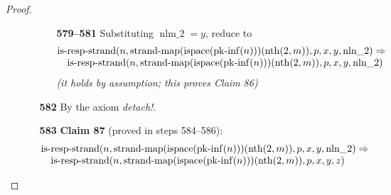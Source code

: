 \documentclass[11pt]{article}
\theoremstyle{plain}
\begin{document}
\begin{proof}
\begin{itemize}[leftmargin=2.8em, itemsep=4pt, parsep=1pt]
\begin{itemize}[leftmargin=2.8em, itemsep=4pt, parsep=1pt]
  \begin{itemize}[leftmargin=2.8em, itemsep=4pt, parsep=1pt]
  \item[\textbf{579--581}] Substituting $\operatorname{nlm\_2} = y$, reduce to
\begin{equation*}
\begin{array}{@{}l@{}} \operatorname{is\text{-}resp\text{-}strand}(n, \operatorname{strand\text{-}map}(\operatorname{ispace}(\operatorname{pk\text{-}inf}(n)))(\operatorname{nth}(2, m)), p, x, y, \operatorname{nln\_2}) \Rightarrow  \\ \quad \operatorname{is\text{-}resp\text{-}strand}(n, \operatorname{strand\text{-}map}(\operatorname{ispace}(\operatorname{pk\text{-}inf}(n)))(\operatorname{nth}(2, m)), p, x, y, \operatorname{nln\_2}) \end{array}
\end{equation*}
  \emph{(it holds by assumption; this proves Claim 86)}
  \end{itemize}
  \item[\textbf{582}] By the axiom \emph{detach!}.
  \item[\textbf{583}] \textbf{Claim 87} (proved in steps 584--586):
\begin{equation*}
\begin{array}{@{}l@{}} \operatorname{is\text{-}resp\text{-}strand}(n, \operatorname{strand\text{-}map}(\operatorname{ispace}(\operatorname{pk\text{-}inf}(n)))(\operatorname{nth}(2, m)), p, x, y, \operatorname{nln\_2}) \Rightarrow  \\ \quad \operatorname{is\text{-}resp\text{-}strand}(n, \operatorname{strand\text{-}map}(\operatorname{ispace}(\operatorname{pk\text{-}inf}(n)))(\operatorname{nth}(2, m)), p, x, y, z) \end{array}
\end{equation*}


\end{itemize}
\end{itemize}
\end{proof}
\end{document}
